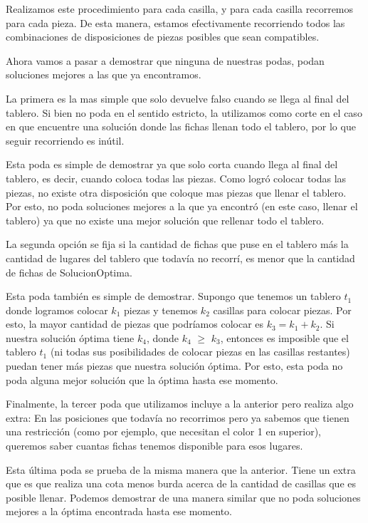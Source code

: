 Realizamos este procedimiento para cada casilla, y para cada casilla recorremos para cada pieza. De esta manera, estamos efectivamente recorriendo todos las combinaciones de disposiciones de piezas posibles que sean compatibles.

Ahora vamos a pasar a demostrar que ninguna de nuestras podas, podan soluciones mejores a las que ya encontramos.

La primera es la mas simple que solo devuelve falso cuando se llega al final del tablero. Si bien no poda en el sentido estricto, la utilizamos como corte en el caso en que encuentre una solución donde las fichas llenan todo el tablero, por lo que seguir recorriendo es inútil.

Esta poda es simple de demostrar ya que solo corta cuando llega al final del tablero, es decir, cuando coloca todas las piezas. Como logró colocar todas las piezas, no existe otra disposición que coloque mas piezas que llenar el tablero. Por esto, no poda soluciones mejores a la que ya encontró (en este caso, llenar el tablero) ya que no existe una mejor solución que rellenar todo el tablero.

La segunda opción se fija si la cantidad de fichas que puse en el tablero más la cantidad de lugares del tablero que todavía no recorrí, es menor que la cantidad de fichas de SolucionOptima.

Esta poda también es simple de demostrar. Supongo que tenemos un tablero $t_1$ donde logramos colocar $k_1$ piezas y tenemos $k_2$ casillas para colocar piezas. Por esto, la mayor cantidad de piezas que podríamos colocar es $k_3 = k_1 + k_2$. Si nuestra solución óptima tiene $k_4$, donde $k_4$ $\geq$ $k_3$, entonces es imposible que el tablero $t_1$ (ni todas sus posibilidades de colocar piezas en las casillas restantes) puedan tener más piezas que nuestra solución óptima. Por esto, esta poda no poda alguna mejor solución que la óptima hasta ese momento.

Finalmente, la tercer poda que utilizamos incluye a la anterior pero realiza algo extra: En las posiciones que todavía no recorrimos pero ya sabemos que tienen una restricción (como por ejemplo, que necesitan el color 1 en superior), queremos saber cuantas fichas tenemos disponible para esos lugares.

Esta última poda se prueba de la misma manera que la anterior. Tiene un extra que es que realiza una cota menos burda acerca de la cantidad de casillas que es posible llenar. Podemos demostrar de una manera similar que no poda soluciones mejores a la óptima encontrada hasta ese momento.

